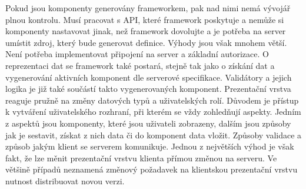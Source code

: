 Pokud jsou komponenty generovány frameworkem, pak nad nimi nemá vývojář plnou kontrolu. Musí pracovat s API, které framework poskytuje a nemůže si komponenty nastavovat jinak, než framework dovolujte a je potřeba na server umístit zdroj, který bude generovat definice. Výhody jsou však mnohem větší. Není potřeba implementovat připojení na server a základní autorizace. O reprezentaci dat se framework také postará, stejně tak jako o získání dat a vygenerování aktivních komponent dle serverové specifikace. Validátory a jejich logika je již také součástí takto vygenerovaných komponent. Prezentační vrstva reaguje pružně na změny datových typů a uživatelských rolí. Důvodem je přístup k vytváření uživatelského rozhraní, při kterém se vždy zohledňují aspekty. Jedním z aspektů jsou komponenty, které jsou uživateli zobrazeny, dalším jsou způsoby jak je sestavit, získat z nich data či do komponent data vložit. Způsoby validace a způsob jakým klient se serverem komunikuje. Jednou z největších výhod je však fakt, že lze měnit prezentační vrstvu klienta přímou změnou na serveru. Ve většině případů neznamená změnový požadavek na klientskou prezentační vrstvu nutnost distribuovat novou verzi.

